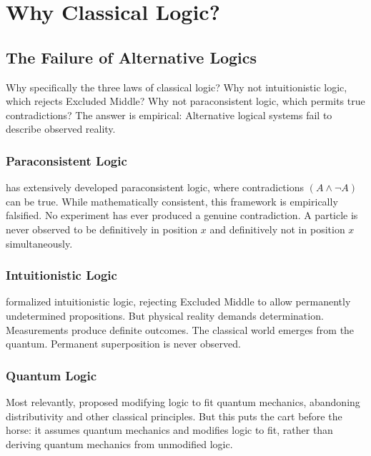 \documentclass[12pt,a4paper]{article}
\begin{document}
\section{Why Classical Logic?}

\subsection{The Failure of Alternative Logics}

Why specifically the three laws of classical logic? Why not intuitionistic logic, which rejects Excluded Middle? Why not paraconsistent logic, which permits true contradictions? The answer is empirical: Alternative logical systems fail to describe observed reality.

\subsubsection{Paraconsistent Logic}

\citet{priest2006doubt} has extensively developed paraconsistent logic, where contradictions $(A \land \neg A)$ can be true. While mathematically consistent, this framework is empirically falsified. No experiment has ever produced a genuine contradiction. A particle is never observed to be definitively in position $x$ and definitively not in position $x$ simultaneously.

\subsubsection{Intuitionistic Logic}

\citet{heyting1971intuitionism} formalized intuitionistic logic, rejecting Excluded Middle to allow permanently undetermined propositions. But physical reality demands determination. Measurements produce definite outcomes. The classical world emerges from the quantum. Permanent superposition is never observed.

\subsubsection{Quantum Logic}

Most relevantly, \citet{birkhoff1936logic} proposed modifying logic to fit quantum mechanics, abandoning distributivity and other classical principles. But this puts the cart before the horse: it assumes quantum mechanics and modifies logic to fit, rather than deriving quantum mechanics from unmodified logic.
\end{document}
